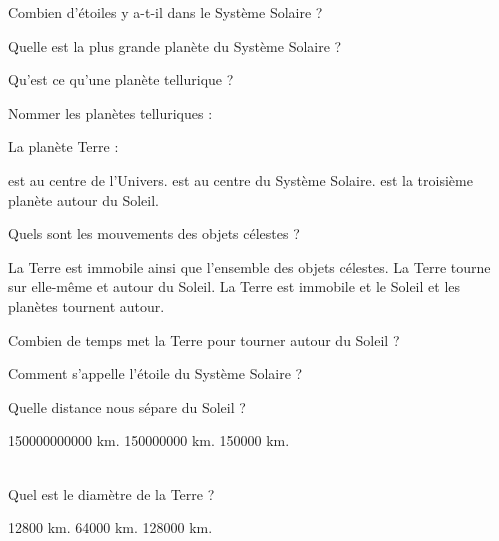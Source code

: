 
\begin{questions}
\question[2] Combien d'étoiles y a-t-il dans le Système Solaire ?
\fillwithdottedlines{1.5cm}

\question[2] Quelle est la plus grande planète du Système Solaire ?
\fillwithdottedlines{1.5cm}

\question[2] Qu'est ce qu'une planète tellurique ?\
\fillwithdottedlines{1.5cm}


\question[2] Nommer les planètes telluriques :
\fillwithdottedlines{2cm}


\question[2] La planète Terre :
\begin{checkboxes}
	\choice est au centre de l'Univers.
	\choice est au centre du Système Solaire.
	\correctchoice est la troisième planète autour du Soleil.\\ 
\end{checkboxes}


\question[2] Quels sont les mouvements des objets célestes ?
\begin{checkboxes}
	\choice La Terre est immobile ainsi que l'ensemble des objets célestes.
	\correctchoice La Terre tourne sur elle-même et autour du Soleil.
	\choice La Terre est immobile et le Soleil et les planètes tournent autour.\\	 
\end{checkboxes}

\newpage

\question[2] Combien de temps met la Terre pour tourner autour du Soleil ?
\fillwithdottedlines{1.5cm}

\question[2] Comment s'appelle l'étoile du Système Solaire ?
\fillwithdottedlines{1.5cm}


\question[2] Quelle distance nous sépare du Soleil ?\\
\begin{oneparcheckboxes}
	\choice \num{150000000000} km.
	\correctchoice \num{150000000} km.
	\choice \num{150000} km.
\end{oneparcheckboxes}\\

\question[2] Quel est le diamètre de la Terre ?\\ 
\begin{oneparcheckboxes}
	\correctchoice \num{12800} km.
	\choice \num{64000} km.
	\choice \num{128000} km.
\end{oneparcheckboxes}

\end{questions}

